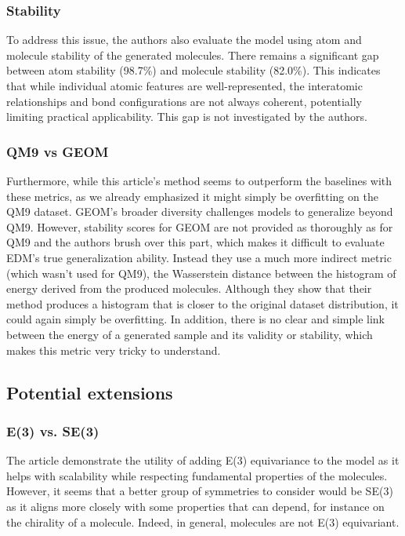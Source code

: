 \documentclass[sigconf]{acmart}
\begin{document}
\subsubsection{Stability}
To address this issue, the authors also evaluate the model using atom and molecule stability of the generated molecules. There remains a significant gap between atom stability (98.7\%) and molecule stability (82.0\%). This indicates that while individual atomic features are well-represented, the interatomic relationships and bond configurations are not always coherent, potentially limiting practical applicability. This gap is not investigated by the authors.
\subsubsection{QM9 vs GEOM}
Furthermore, while this article's method seems to outperform the baselines with these metrics, as we already emphasized it might simply be overfitting on the QM9 dataset. GEOM’s broader diversity challenges models to generalize beyond QM9. However, stability scores for GEOM are not provided as thoroughly as for QM9 and the authors brush over this part, which makes it difficult to evaluate EDM's true generalization ability. Instead they use a much more indirect metric (which wasn't used for QM9), the Wasserstein distance between the histogram of energy derived from the produced molecules. Although they show that their method produces a histogram that is closer to the original dataset distribution, it could again simply be overfitting. In addition, there is no clear and simple link between the energy of a generated sample and its validity or stability, which makes this metric very tricky to understand.

\subsection{Potential extensions}
\subsubsection{E(3) vs. SE(3)}
The article demonstrate the utility of adding E(3) equivariance to the model as it helps with scalability while respecting fundamental properties of the molecules. However, it seems that a better group of symmetries to consider would be SE(3) as it aligns more closely with some properties that can depend, for instance on the chirality of a molecule. Indeed, in general, molecules are not E(3) equivariant.
\end{document}
